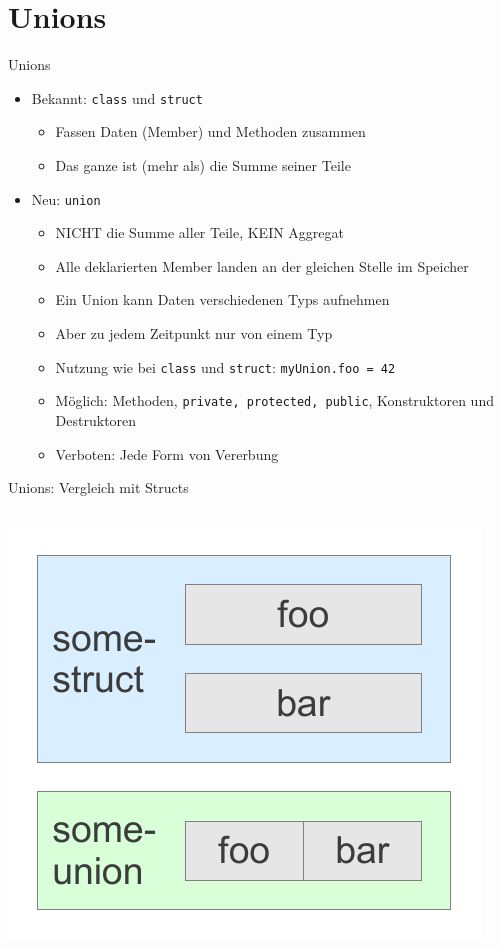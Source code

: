 \section{Unions}

\begin{frame}[fragile]{Unions}
	\begin{itemize}
		\item Bekannt: \verb|class| und \verb|struct|
		\begin{itemize}
			\item Fassen Daten (Member) und Methoden zusammen
			\item Das ganze ist (mehr als) die Summe seiner Teile
		\end{itemize}
		\pause
		\item Neu: \verb|union|
		\begin{itemize}
			\item NICHT die Summe aller Teile, KEIN Aggregat
			\item Alle deklarierten Member landen an der gleichen Stelle im Speicher
			\item Ein Union kann Daten verschiedenen Typs aufnehmen
			\item Aber zu jedem Zeitpunkt nur von einem Typ
			\item Nutzung wie bei \verb|class| und \verb|struct|: \verb|myUnion.foo = 42|
			\item Möglich: Methoden, \verb|private, protected, public|, Konstruktoren und Destruktoren
			\item Verboten: Jede Form von Vererbung
		\end{itemize}
	\end{itemize}
\end{frame}

\begin{frame}[fragile]{Unions: Vergleich mit Structs}
	\begin{columns}
			
			
			\includegraphics[width=\linewidth]{images/structunion.pdf}
	\end{columns}
\end{frame}

